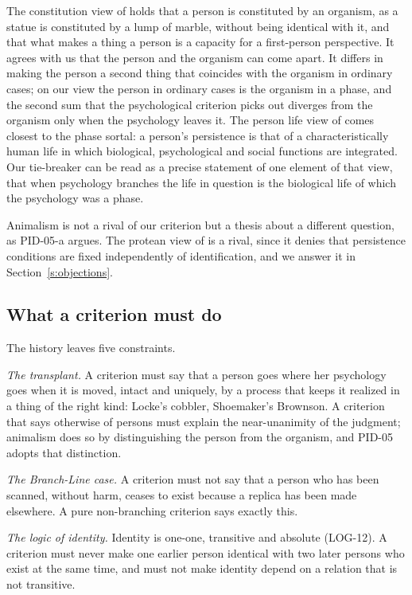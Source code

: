 \documentclass{situationist-preprint}
\begin{document}
The constitution view of \citet{Baker2000} holds that a person is constituted by an organism, as a statue is constituted by a lump of marble, without being identical with it, and that what makes a thing a person is a capacity for a first-person perspective. It agrees with us that the person and the organism can come apart. It differs in making the person a second thing that coincides with the organism in ordinary cases; on our view the person in ordinary cases is the organism in a phase, and the second sum that the psychological criterion picks out diverges from the organism only when the psychology leaves it. The person life view of \citet{Schechtman2014} comes closest to the phase sortal: a person's persistence is that of a characteristically human life in which biological, psychological and social functions are integrated. Our tie-breaker can be read as a precise statement of one element of that view, that when psychology branches the life in question is the biological life of which the psychology was a phase.

Animalism \citep{Olson1997,Snowdon2014} is not a rival of our criterion but a thesis about a different question, as PID-05-a argues. The protean view of \citet{Johnston2010} is a rival, since it denies that persistence conditions are fixed independently of identification, and we answer it in Section~\ref{s:objections}.

\subsection{What a criterion must do}

The history leaves five constraints.

\emph{The transplant.} A criterion must say that a person goes where her psychology goes when it is moved, intact and uniquely, by a process that keeps it realized in a thing of the right kind: Locke's cobbler, Shoemaker's Brownson. A criterion that says otherwise of persons must explain the near-unanimity of the judgment; animalism does so by distinguishing the person from the organism, and PID-05 adopts that distinction.

\emph{The Branch-Line case.} A criterion must not say that a person who has been scanned, without harm, ceases to exist because a replica has been made elsewhere. A pure non-branching criterion says exactly this.

\emph{The logic of identity.} Identity is one-one, transitive and absolute (LOG-12). A criterion must never make one earlier person identical with two later persons who exist at the same time, and must not make identity depend on a relation that is not transitive.
\end{document}
